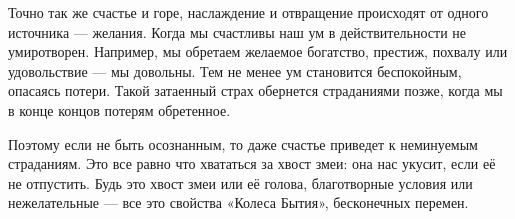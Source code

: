 Точно так же счастье и горе, наслаждение и отвращение происходят от одного источника — желания. Когда мы счастливы наш ум в действительности не умиротворен. Например, мы обретаем желаемое богатство, престиж, похвалу или удовольствие — мы довольны. Тем не менее ум становится беспокойным, опасаясь потери. Такой затаенный страх обернется страданиями позже, когда мы в конце концов потерям обретенное.

Поэтому если не быть осознанным, то даже счастье приведет к неминуемым страданиям. Это все равно что хвататься за хвост змеи: она нас укусит, если её не отпустить. Будь это хвост змеи или её голова, благотворные условия или нежелательные — все это свойства «Колеса Бытия», бесконечных перемен.

